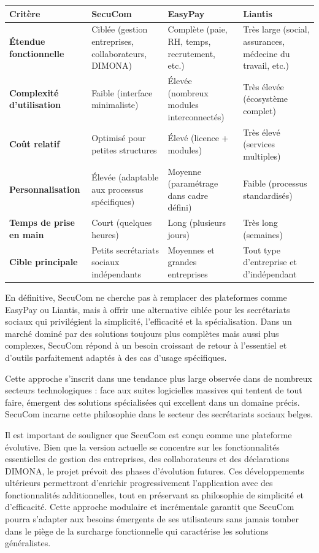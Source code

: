 \documentclass[12pt,a4paper]{report}
\begin{document}
\begin{center}
\begin{tabular}{|p{3cm}|p{3.5cm}|p{3.5cm}|p{3.5cm}|}
\hline
\textbf{Critère} & \textbf{SecuCom} & \textbf{EasyPay} & \textbf{Liantis} \\
\hline
\textbf{Étendue fonctionnelle} & Ciblée (gestion entreprises, collaborateurs, DIMONA) & Complète (paie, RH, temps, recrutement, etc.) & Très large (social, assurances, médecine du travail, etc.) \\
\hline
\textbf{Complexité d'utilisation} & Faible (interface minimaliste) & Élevée (nombreux modules interconnectés) & Très élevée (écosystème complet) \\
\hline
\textbf{Coût relatif} & Optimisé pour petites structures & Élevé (licence + modules) & Très élevé (services multiples) \\
\hline
\textbf{Personnalisation} & Élevée (adaptable aux processus spécifiques) & Moyenne (paramétrage dans cadre défini) & Faible (processus standardisés) \\
\hline
\textbf{Temps de prise en main} & Court (quelques heures) & Long (plusieurs jours) & Très long (semaines) \\
\hline
\textbf{Cible principale} & Petits secrétariats sociaux indépendants & Moyennes et grandes entreprises & Tout type d'entreprise et d'indépendant \\
\hline
\end{tabular}
\end{center}

En définitive, SecuCom ne cherche pas à remplacer des plateformes comme EasyPay ou Liantis, mais à offrir une alternative ciblée pour les secrétariats sociaux qui privilégient la simplicité, l'efficacité et la spécialisation. Dans un marché dominé par des solutions toujours plus complètes mais aussi plus complexes, SecuCom répond à un besoin croissant de retour à l'essentiel et d'outils parfaitement adaptés à des cas d'usage spécifiques.

Cette approche s'inscrit dans une tendance plus large observée dans de nombreux secteurs technologiques : face aux suites logicielles massives qui tentent de tout faire, émergent des solutions spécialisées qui excellent dans un domaine précis. SecuCom incarne cette philosophie dans le secteur des secrétariats sociaux belges.

Il est important de souligner que SecuCom est conçu comme une plateforme évolutive. Bien que la version actuelle se concentre sur les fonctionnalités essentielles de gestion des entreprises, des collaborateurs et des déclarations DIMONA, le projet prévoit des phases d'évolution futures. Ces développements ultérieurs permettront d'enrichir progressivement l'application avec des fonctionnalités additionnelles, tout en préservant sa philosophie de simplicité et d'efficacité. Cette approche modulaire et incrémentale garantit que SecuCom pourra s'adapter aux besoins émergents de ses utilisateurs sans jamais tomber dans le piège de la surcharge fonctionnelle qui caractérise les solutions généralistes.
\end{document}
